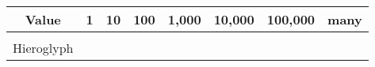 \documentclass{standalone}
\begin{document}
\begin{tabular}{|c|c|c|c|c|c|c|c|}
		Value &   1 & 10 & 100 & 1,000 & 10,000 & 100,000 & many  \\ \hline
		& & & & & & & \\
		Hieroglyph & \textpmhg{\Hone} & \textpmhg{\Hten} & \textpmhg{\Hhundred} & \textpmhg{\Hthousand} & \textpmhg{\HXthousand} & \textpmhg{\HCthousand} & \textpmhg{\Hmillion}  \\
\end{tabular}
\end{document}
